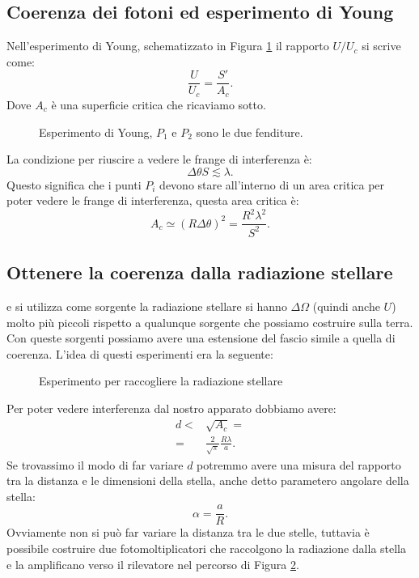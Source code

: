 \subsection{Coerenza dei fotoni ed esperimento di Young}
\label{subsec:Coerenza dei fotoni ed esperimento di Young}
Nell'esperimento di Young, schematizzato in Figura \ref{fig:esperimento-di-young} il rapporto $U /U_c$ si scrive come:
\[
	\frac{U}{U_c} = \frac{S'}{A_c}
.\] 
Dove $A_c$ è una superficie critica che ricaviamo sotto.
\begin{figure}[H]
    \centering
    \caption{Esperimento di Young, $P_1$ e $P_2$ sono le due fenditure.}
    \label{fig:esperimento-di-young}
\end{figure}
\noindent
La condizione per riuscire a vedere le frange di interferenza è:
\[
	\Delta \theta S \lesssim \lambda 
.\] 
Questo significa che i punti $P_i$ devono stare all'interno di un area critica per poter vedere le frange di interferenza, questa area critica è:
\[
	A_c \simeq \left( R \Delta \theta  \right)^2 =
	\frac{R^2 \lambda ^2}{S^2}
.\] 

\subsection{Ottenere la coerenza dalla radiazione stellare}
\label{subsec:Ottenere la coerenza dalla radiazione stellare}
e si utilizza come sorgente la radiazione stellare si hanno $\Delta \Omega $ (quindi anche $U$) molto più piccoli rispetto a qualunque sorgente che possiamo costruire sulla terra.\\
Con queste sorgenti possiamo avere una estensione del fascio simile a quella di coerenza. L'idea di questi esperimenti era la seguente:
\begin{figure}[H]
    \centering
    \caption{Esperimento per raccogliere la radiazione stellare}
    \label{fig:esperimento-per-raccogliere-la-radiazione-stellare}
\end{figure}
\noindent
Per poter vedere interferenza dal nostro apparato dobbiamo avere:
\[\begin{aligned}
	 d 
	 <&
	 \sqrt{A_c} =\\
	 =& \frac{2}{\sqrt{\pi}}\frac{R\lambda }{a}
.\end{aligned}\]
Se trovassimo il modo di far variare $d$ potremmo avere una misura del rapporto tra la distanza e le dimensioni della stella, anche detto parametero angolare della stella:
\[
	\alpha = \frac{a}{R}
.\] 
Ovviamente non si può far variare la distanza tra le due stelle, tuttavia è possibile costruire due fotomoltiplicatori che raccolgono la radiazione dalla stella e la amplificano verso il rilevatore nel percorso di Figura \ref{fig:esperimento-per-raccogliere-la-radiazione-stellare}.
